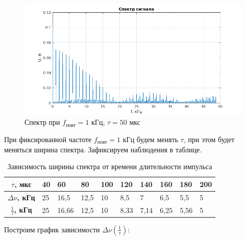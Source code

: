 \documentclass[a4paper, 12pt]{article}%
\begin{document}
\begin{figure}[h!]
    \centering
    \includegraphics[width = 14 cm]{images/1_50_1.png}
    \caption{Спектр при $f_{\text{повт}} = 1$ кГц, $\tau = 50$ мкс}
\end{figure}

При фиксированной частоте $f_{\text{повт}} = 1$ кГц будем менять $\tau$, при этом будет меняться ширина спектра. Зафиксируем наблюдения в таблице.

\begin{table}[]
    \centering
    \begin{tabular}{|c|l|l|l|l|l|l|l|l|l|}
        \hline
        \textbf{$\tau$, мкс}           & 40 & 60    & 80   & 100 & 120  & 140  & 160  & 180  & 200 \\ \hline
        \textbf{$\Delta \nu$, кГц}     & 25 & 16,5  & 12,5 & 10  & 8,5  & 7    & 6,5  & 5,5  & 5   \\ \hline
        \textbf{$\frac{1}{\tau}$, кГц} & 25 & 16,66 & 12,5 & 10  & 8,33 & 7,14 & 6,25 & 5,56 & 5   \\ \hline
    \end{tabular}
    \caption{Зависимость ширины спектра от времени длительности импульса}
\end{table}

Построим график зависимости $\Delta \nu (\frac{1}{\tau})$:
\end{document}
